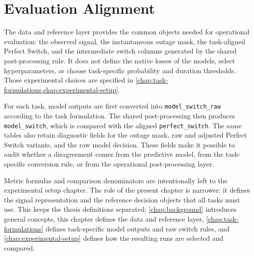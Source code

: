 \section{Evaluation Alignment}

The data and reference layer provides the common objects needed for operational
evaluation: the observed signal, the instantaneous outage mask, the
task-aligned Perfect Switch, and the intermediate switch columns generated by
the shared post-processing rule. It does not define the native losses of the
models, select hyperparameters, or choose task-specific probability and
duration thresholds. Those experimental choices are specified in
\cref{chap:task-formulations,chap:experimental-setup}.

For each task, model outputs are first converted into
\texttt{model\_switch\_raw} according to the task formulation. The shared
post-processing then produces \texttt{model\_switch}, which is compared with the
aligned \texttt{perfect\_switch}. The same tables also retain diagnostic fields
for the outage mask, raw and adjusted Perfect Switch variants, and the raw model
decision. These fields make it possible to audit whether a disagreement comes
from the predictive model, from the task-specific conversion rule, or from the
operational post-processing layer.

Metric formulas and comparison denominators are intentionally left to the
experimental setup chapter. The role of the present chapter is narrower: it
defines the signal representation and the reference decision objects that all
tasks must use. This keeps the thesis definitions separated: \cref{chap:background}
introduces general concepts, this chapter defines the data and reference layer,
\cref{chap:task-formulations} defines task-specific model outputs and raw switch
rules, and \cref{chap:experimental-setup} defines how the resulting runs are
selected and compared.
